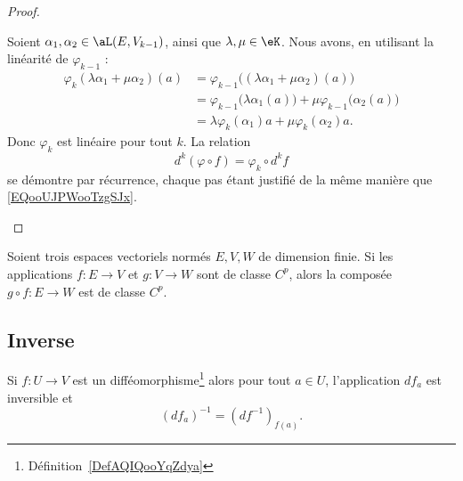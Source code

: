 \begin{proof}
	\begin{subproof}
		Soient \( \alpha_1,\alpha_2\in \aL(E,V_{k-1})\), ainsi que \( \lambda,\mu\in \eK\). Nous avons, en utilisant la linéarité de \( \varphi_{k-1}\) :
		\begin{subequations}
			\begin{align}
				\varphi_k(\lambda\alpha_1+\mu\alpha_2)(a) & =\varphi_{k-1}\big( (\lambda\alpha_1+\mu\alpha_2)(a) \big)                          \\
				                                          & =\varphi_{k-1}\big(\lambda \alpha_1(a)\big)+\mu\varphi_{k-1}\big( \alpha_2(a) \big) \\
				                                          & =\lambda\varphi_k(\alpha_1)a+\mu\varphi_k(\alpha_2)a.
			\end{align}
		\end{subequations}
		Donc \( \varphi_k\) est linéaire pour tout \( k\).
		\spitem[La relation]
		La relation
		\begin{equation}
			d^k(\varphi\circ f)=\varphi_k\circ d^kf
		\end{equation}
		se démontre par récurrence, chaque pas étant justifié de la même manière que \eqref{EQooUJPWooTzgSJx}.
	\end{subproof}
\end{proof}

\begin{proposition}[Composition]		\label{PROPooLRRMooRzrTNE}
	Soient trois espaces vectoriels normés \( E,V,W\) de dimension finie. Si les applications \(f \colon E\to V  \) et \( g \colon V\to W  \) sont de classe \( C^p\), alors la composée \(g\circ f \colon E\to W  \) est de classe \( C^p\).
\end{proposition}

\ssdem

\subsection{Inverse}


\begin{lemma}       \label{LemooTJSZooWkuSzv}
	Si \( f\colon U\to V\) est un difféomorphisme\footnote{Définition~\ref{DefAQIQooYqZdya}} alors pour tout \( a\in U\), l'application \( df_a\) est inversible et
	\begin{equation}
		(df_a)^{-1}=(df^{-1})_{f(a)}.
	\end{equation}
\end{lemma}


